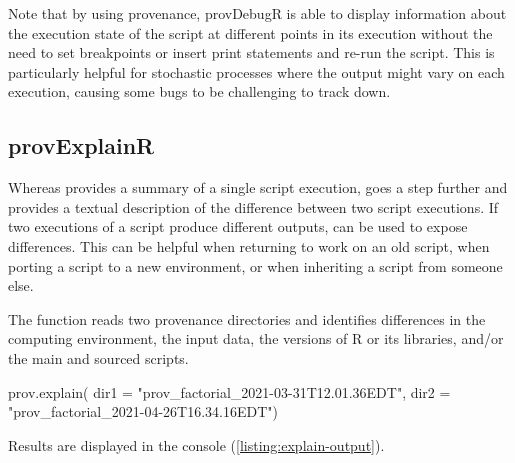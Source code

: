 Note that by using provenance, provDebugR is able to display information about the execution state of the script at different points in its execution without the need to set breakpoints or insert print statements and re-run the script.  This is particularly helpful for stochastic processes where the output might vary on each execution, causing some bugs to be challenging to track down.

\subsection{provExplainR}

Whereas  provides a summary of a single script execution,  goes a step further and provides a textual description of the difference between two script executions.  If two executions of a script produce different outputs,  can be used to expose differences.  This can be helpful when returning to work on an old script, when porting a script to a new environment, or when inheriting a script from someone else.

The  function reads two provenance directories and identifies differences in the computing environment, the input data, the versions of R or its libraries, and/or the main and sourced scripts.
\begin{example}
prov.explain(
  dir1 = "prov_factorial_2021-03-31T12.01.36EDT", 
  dir2 = "prov_factorial_2021-04-26T16.34.16EDT")
\end{example}
Results are displayed in the console (\autoref{listing:explain-output}).

%

